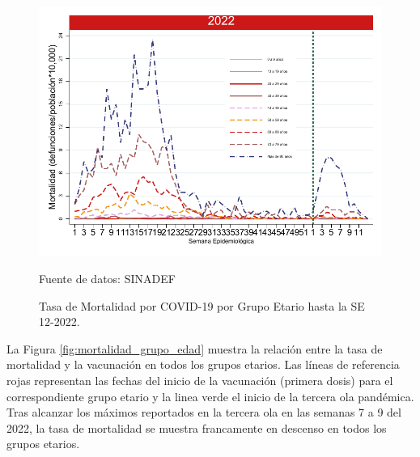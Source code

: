 \documentclass[12pt,a4paper,openany]{book}
\begin{document}
\begin{figure}[h]
	\caption{Tasa de Mortalidad por COVID-19 por Grupo Etario hasta la SE 12-2022.}\label{fig:mortalidad_edad}
	\begin{center}
		\includegraphics[width=0.65\linewidth]{../figuras/mortalidad_edad_2021_2022.pdf}
	\end{center}
	{\footnotesize Fuente de datos: SINADEF} 
\end{figure}


La Figura \ref{fig:mortalidad_grupo_edad} muestra la relación entre la tasa de mortalidad y la vacunación en todos los grupos etarios. Las líneas de referencia rojas representan las fechas del inicio de la vacunación (primera dosis) para el correspondiente grupo etario y la linea verde el inicio de la tercera ola pandémica. Tras alcanzar los máximos reportados en la tercera ola en las semanas 7 a 9 del 2022, la tasa de mortalidad se muestra francamente en descenso en todos los grupos etarios. 
\end{document}
